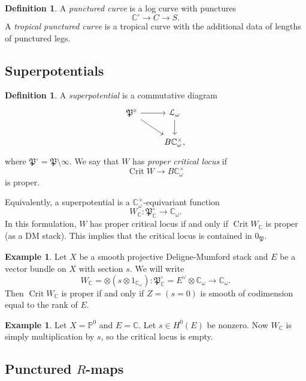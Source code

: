 \documentclass[10pt,oldfontcommands,oneside]{memoir}
\theoremstyle{definition}
\newtheorem{defn}[thm]{Definition}
\newtheorem{exm}[thm]{Example}
\theoremstyle{remark}
\theoremstyle{plain}
\theoremstyle{definition}
\theoremstyle{remark}
\newcommand{\C}{\mathbb{C}}
\renewcommand{\P}{\mathbb{P}}
\newcommand{\mc}[1]{\mathcal{#1}}
\newcommand{\mf}[1]{\mathfrak{#1}}
\newcommand{\on}[1]{\operatorname{#1}}
\newcommand{\1}{\mathbf{1}}
\newcommand{\2}{\mathbf{2}}
\newcommand{\3}{\mathbf{3}}
\DeclareMathOperator{\Crit}{Crit}
\begin{document}
\begin{defn}
    A \textit{punctured curve} is a log curve with punctures
    \[ \C^{\circ} \to C \to S. \]
    A \textit{tropical punctured curve} is a tropical curve with the additional data of lengths of punctured legs.
\end{defn}

\subsection{Superpotentials}%
\label{sub:Superpotentials}

\begin{defn}
    A \textit{superpotential} is a commutative diagram
    \begin{equation*}
    \begin{tikzcd}
        \mf{P}^{\circ} \ar{r} \ar{dr} & \mc{L}_{\omega} \ar{d} \\
        & B \C^{\times}_{\omega},
    \end{tikzcd}
    \end{equation*}
    where $\mf{P}^{\circ} = \mf{P} \setminus \infty$. We say that $W$ has \textit{proper critical locus} if
    \[ \on{Crit} W \to B \C_{\omega}^{\times} \]
    is proper.
\end{defn}

Equivalently, a superpotential is a $\C_{\omega}^{\times}$-equivariant function
\[ W_{\C} \colon \mf{P}_{\C}^{\circ} \to \C_{\omega}. \]
In this formulation, $W$ has proper critical locus if and only if $\on{Crit} W_{\C}$ is proper (as a DM stack). This implies that the critical locus is contained in $0_{\mf{P}}$.

\begin{exm}
    Let $X$ be a smooth projective Deligne-Mumford stack and $E$ be a vector bundle on $X$ with section $s$. We will write
    \[ W_{\C} = \otimes (s \otimes 1_{\C_{\omega}}) \colon \mf{P}_{\C}^{\circ} = E^{\vee} \otimes \C_{\omega} \to \C_{\omega}. \]
    Then $\Crit W_{\C}$ is proper if and only if $Z = (s=0)$ is smooth of codimension equal to the rank of $E$.
\end{exm}

\begin{exm}
    Let $X = \P^0$ and $E = \C$. Let $s \in H^0(E)$ be nonzero. Now $W_{\C}$ is simply multiplication by $s$, so the critical locus is empty.
\end{exm}

\subsection{Punctured $R$-maps}%
\label{sub:Punctured R-maps}
\end{document}
